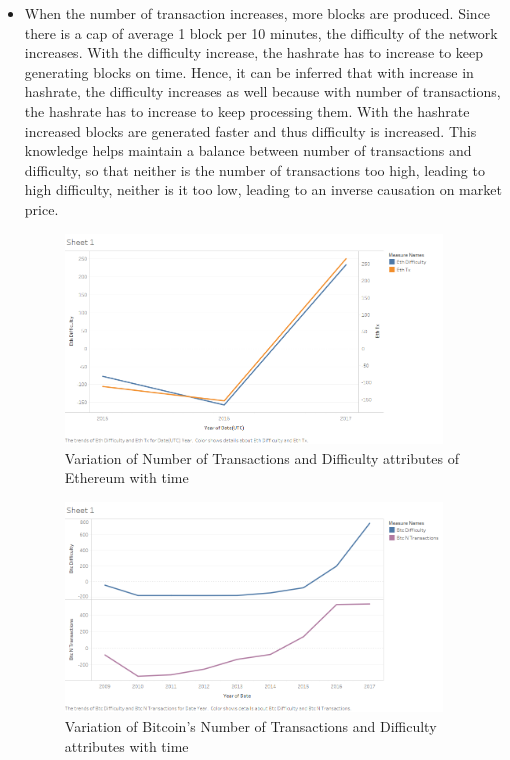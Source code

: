 \documentclass{article}
\begin{document}
\begin{itemize}
\item When the number of transaction increases, more blocks are produced. Since there is a cap of average 1 block per 10 minutes, the difficulty of the network increases. With the difficulty increase, the hashrate has to increase to keep generating blocks on time. Hence, it can be inferred that with increase in hashrate, the difficulty increases as well because with number of transactions, the hashrate has to increase to keep processing them. With the hashrate increased blocks are generated faster and thus difficulty is increased.
This knowledge helps maintain a balance between number of transactions and difficulty, so that neither is the number of transactions too high, leading to high difficulty, neither is it too low, leading to an inverse causation on market price.
\begin{figure}[h]
    \centering
    \includegraphics[width=10cm]{eth_transactions_difficulty.png}
    \caption{Variation of Number of Transactions and Difficulty attributes of Ethereum with time}
    \label{fig:my_label}
\end{figure}

\newpage
\begin{figure}[h]
    \centering
    \includegraphics[width=10cm]{btc_transactions_difficulty.png}
    \caption{Variation of Bitcoin's Number of Transactions and Difficulty attributes with time}
    \label{fig:my_label}
\end{figure}


\end{itemize}
\end{document}
